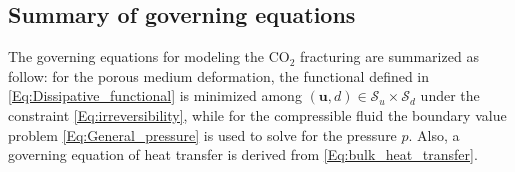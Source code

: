 %

\subsection{Summary of governing equations} The governing equations for modeling the CO$_2$ fracturing are summarized as follow: for the porous medium deformation, the functional defined in \eqref{Eq:Dissipative_functional} is minimized among $(\bm{u},d)\in \mathscr{S}_u\times\mathscr{S}_d$ under the constraint \eqref{Eq:irreversibility}, while %
for the compressible fluid the boundary value problem \eqref{Eq:General_pressure} is used to solve for the pressure $p$. Also, a governing equation of heat transfer is derived from \eqref{Eq:bulk_heat_transfer}.
